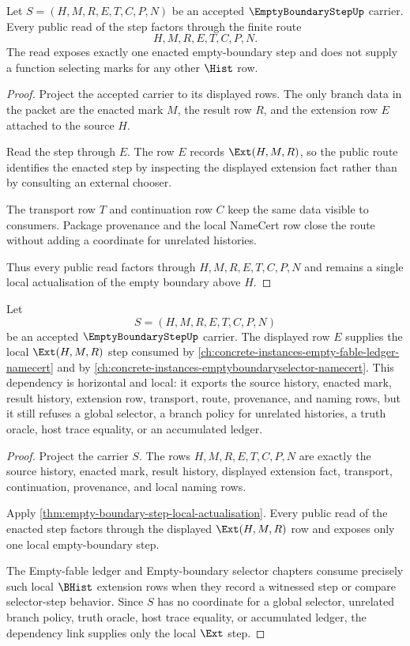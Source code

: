 \begin{theorem}
\label{thm:empty-boundary-step-local-actualisation}
Let $S=(H,M,R,E,T,C,P,N)$ be an accepted $\EmptyBoundaryStepUp$ carrier. Every public read of the step factors through the finite route
$$
H,M,R,E,T,C,P,N.
$$
The read exposes exactly one enacted empty-boundary step and does not supply a function selecting marks for any other $\Hist$ row.
\end{theorem}
\begin{proof}
Project the accepted carrier to its displayed rows. The only branch data in the packet are the enacted mark $M$, the result row $R$, and the extension row $E$ attached to the source $H$.

Read the step through $E$. The row $E$ records $\Ext(H,M,R)$, so the public route identifies the enacted step by inspecting the displayed extension fact rather than by consulting an external chooser.

The transport row $T$ and continuation row $C$ keep the same data visible to consumers. Package provenance and the local NameCert row close the route without adding a coordinate for unrelated histories.

Thus every public read factors through $H,M,R,E,T,C,P,N$ and remains a single local actualisation of the empty boundary above $H$.
\end{proof}

\begin{theorem}
\label{thm:empty-boundary-step-bhist-ext-dependency-link}
Let
$$
S=(H,M,R,E,T,C,P,N)
$$
be an accepted $\EmptyBoundaryStepUp$ carrier. The displayed row $E$ supplies the local $\Ext(H,M,R)$ step consumed by \autoref{ch:concrete-instances-empty-fable-ledger-namecert} and by \autoref{ch:concrete-instances-emptyboundaryselector-namecert}. This dependency is horizontal and local: it exports the source history, enacted mark, result history, extension row, transport, route, provenance, and naming rows, but it still refuses a global selector, a branch policy for unrelated histories, a truth oracle, host trace equality, or an accumulated ledger.
\end{theorem}
\begin{proof}
Project the carrier $S$. The rows $H,M,R,E,T,C,P,N$ are exactly the source history, enacted mark, result history, displayed extension fact, transport, continuation, provenance, and local naming rows.

Apply \autoref{thm:empty-boundary-step-local-actualisation}. Every public read of the enacted step factors through the displayed $\Ext(H,M,R)$ row and exposes only one local empty-boundary step.

The Empty-fable ledger and Empty-boundary selector chapters consume precisely such local $\BHist$ extension rows when they record a witnessed step or compare selector-step behavior. Since $S$ has no coordinate for a global selector, unrelated branch policy, truth oracle, host trace equality, or accumulated ledger, the dependency link supplies only the local $\Ext$ step.
\end{proof}

